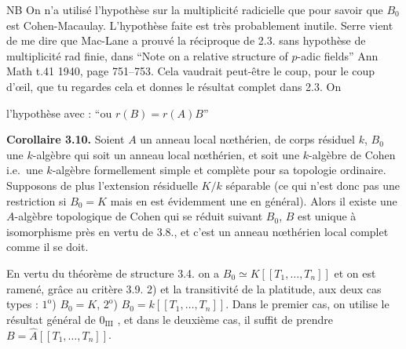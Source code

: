 \documentclass[11pt,a4paper]{article}
\begin{document}
\struck{\ill{}} 

NB On n'a utilisé l'hypothèse sur la multiplicité radicielle que pour
 savoir que $B_0$ est Cohen-Macaulay. L'hypothèse faite est
très probablement inutile. Serre vient de me dire que Mac-Lane a prouvé la
réciproque de 2.3. sans hypothèse de multiplicité rad finie, dans ``Note on a
relative structure of $p$-adic fields'' Ann Math t.41 1940, page 751--753.
Cela vaudrait peut-être le coup, pour  le coup d'œil, que
tu regardes cela et donnes le résultat complet dans 2.3. On


   l'hypothèse
 avec : ``ou \struck{\ill{}} $r(B) = r(A)B$''

\textbf{Corollaire 3.10.} Soient $A$ un anneau local nœthérien, de corps
résiduel $k$, $B_0$ une $k$-algèbre qui soit un anneau local nœthérien, et
soit une $k$-algèbre de Cohen i.e.\ une $k$-algèbre formellement simple
 et complète pour sa topologie ordinaire. Supposons de plus
l'extension résiduelle $K/k$ séparable (ce qui n'est donc pas une restriction
si $B_0 = K$ \struck{\ill{}} mais en est évidemment une en général). Alors il
existe une $A$-algèbre topologique de Cohen  qui se réduit suivant
$B_0$, $B$ est unique à isomorphisme près en vertu de 3.8., et c'est un anneau
nœthérien local complet comme il se doit.

En vertu du théorème de structure 3.4. on a $B_0 \simeq K[[T_1, \ldots, T_n]]$
et on est ramené, grâce au critère 3.9. 2) et la transitivité de la platitude,
aux deux cas types : $1^{\mathrm{o}}$) $B_0 = K$, $2^{\mathrm{o}}$)
$B_0 = k[[T_1, \ldots, T_n]]$. Dans le premier cas, on utilise le résultat
général de $0_{\mathrm{III}}$ , et dans le deuxième cas, il
suffit de prendre $B = \hat{A}[[T_1, \ldots, T_n]]$.
\end{document}
